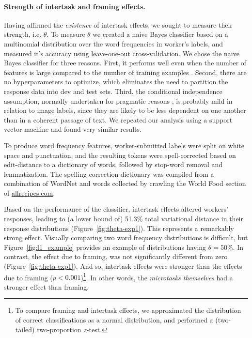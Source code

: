 \documentclass{sigchi}
\begin{document}
\paragraph{Strength of intertask and framing effects.}
Having affirmed the \textit{existence} of intertask effects, we sought to
measure their strength, i.e. $\theta$.
To measure $\theta$ we created a naive Bayes classifier based on a 
multinomial distribution over the word frequencies in worker's labels, 
and measured it's accuracy using leave-one-out cross-validation.  
We chose the naive Bayes
classifier for three reasons.  First, it performs well even when the 
number of features is large compared to the number of training examples
\cite{bickel2004,hastie2009elements}.  
Second, there are no hyperparameters to 
optimize, which eliminates the need to partition the response data into
dev and test sets.
Third, the conditional independence assumption, normally 
undertaken for pragmatic reasons \cite{Zhang2004562}, 
is probably mild in 
relation to image labels, since they are likely to be less dependent
on one another than in a coherent passage of text.  We repeated our
analysis using a support vector machine and found very similar results.

To produce word frequency features, worker-submitted labels were split on 
white
space and punctuation, and the resulting tokens were spell-corrected based
on edit-distance to a dictionary of words, followed by stop-word removal
and lemmatization.  The spelling correction
dictionary was compiled from a combination of WordNet 
\cite{felbaum1998wordnet} and words
collected by crawling the World Food section of \url{allrecipes.com}.

Based on the performance of the classifier, intertask effects altered
workers' responses, leading to (a lower bound of) 51.3\% total variational 
distance in their response distributions (Figure~\ref{fig:theta-exp1}).  
This represents a remarkably strong effect.
Visually comparing two word frequency distributions is difficult, but 
Figure~\ref{fig:l1_example} provides an example of distributions having 
$\theta = 50\%$.  In contrast, the effect due to framing, was not 
significantly different from zero (Figure~\ref{fig:theta-exp1}).
And so, intertask effects were stronger than the effects due to 
framing ($p<0.001$)\footnote{
  To compare framing and intertask 
  effects, we approximated the distribution
  of correct classifications as a normal distribution, and performed
  a (two-tailed) two-proportion $z$-test.
}.
In other words, the \textit{microtasks themselves} had a stronger effect 
than framing.
\end{document}
